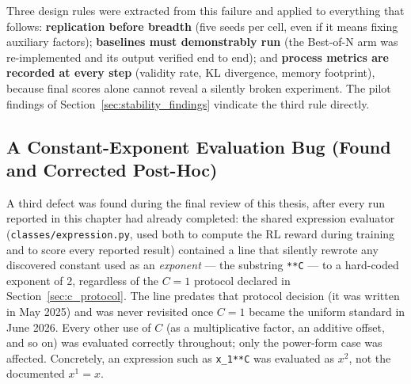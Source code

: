 Three design rules were extracted from this failure and applied to everything that follows: \textbf{replication before breadth} (five seeds per cell, even if it means fixing auxiliary factors); \textbf{baselines must demonstrably run} (the Best-of-N arm was re-implemented and its output verified end to end); and \textbf{process metrics are recorded at every step} (validity rate, KL divergence, memory footprint), because final scores alone cannot reveal a silently broken experiment. The pilot findings of Section~\ref{sec:stability_findings} vindicate the third rule directly.

\subsection{A Constant-Exponent Evaluation Bug (Found and Corrected Post-Hoc)}
\label{sec:c_bug}

A third defect was found during the final review of this thesis, after every run reported in this chapter had already completed: the shared expression evaluator (\texttt{classes/expression.py}, used both to compute the RL reward during training and to score every reported result) contained a line that silently rewrote any discovered constant used as an \emph{exponent} --- the substring \texttt{**C} --- to a hard-coded exponent of 2, regardless of the $C=1$ protocol declared in Section~\ref{sec:c_protocol}. The line predates that protocol decision (it was written in May 2025) and was never revisited once $C=1$ became the uniform standard in June 2026. Every other use of $C$ (as a multiplicative factor, an additive offset, and so on) was evaluated correctly throughout; only the power-form case was affected. Concretely, an expression such as \texttt{x\_1**C} was evaluated as $x^2$, not the documented $x^1=x$.

